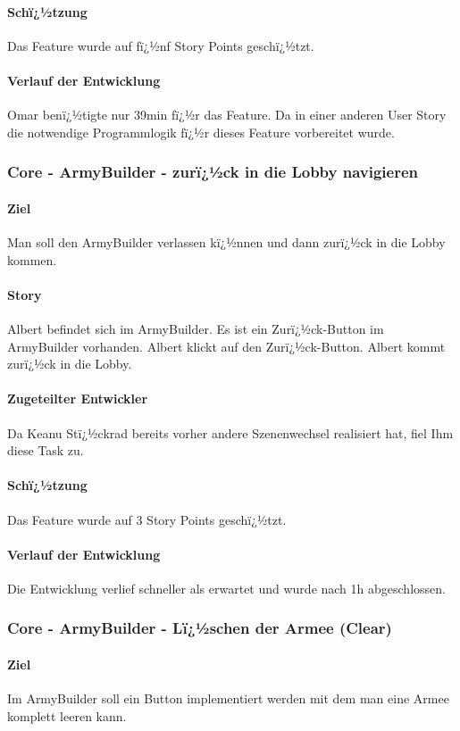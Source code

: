 \documentclass[12pt, titlepage]{scrartcl}
\begin{document}
		\paragraph{Schï¿½tzung}
		Das Feature wurde auf fï¿½nf Story Points geschï¿½tzt.
		\paragraph{Verlauf der Entwicklung} Omar benï¿½tigte nur 39min fï¿½r das Feature. Da in einer anderen User Story die notwendige Programmlogik fï¿½r dieses Feature vorbereitet wurde.
		
		\subsubsection{Core - ArmyBuilder - zurï¿½ck in die Lobby navigieren}
		\paragraph{Ziel} Man soll den ArmyBuilder verlassen kï¿½nnen und dann zurï¿½ck in die Lobby kommen.
		\paragraph{Story} Albert befindet sich im ArmyBuilder. Es ist ein Zurï¿½ck-Button im ArmyBuilder vorhanden. Albert klickt auf den Zurï¿½ck-Button. Albert kommt zurï¿½ck in die Lobby.
		\paragraph{Zugeteilter Entwickler} Da Keanu Stï¿½ckrad bereits vorher andere Szenenwechsel realisiert hat, fiel Ihm diese Task zu.
		\paragraph{Schï¿½tzung}
		Das Feature wurde auf 3 Story Points geschï¿½tzt.
		\paragraph{Verlauf der Entwicklung} 
		Die Entwicklung verlief schneller als erwartet und wurde nach 1h abgeschlossen.
		
		\subsubsection{Core - ArmyBuilder - Lï¿½schen der Armee (Clear)}
		\paragraph{Ziel} Im ArmyBuilder soll ein Button implementiert werden mit dem man eine Armee komplett leeren kann.
\end{document}
